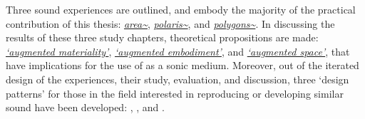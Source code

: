 \begin{SingleSpace}
    Three sound  experiences are outlined, and embody the majority of the practical contribution of this thesis: \textit{\hyperref[sec: area]{area\textasciitilde{}}}, \textit{\hyperref[sec: polaris]{polaris\textasciitilde{}}}, and \textit{\hyperref[sec: polygons]{polygons\textasciitilde{}}}. In discussing the results of these three study chapters, theoretical propositions are made: \textit{\hyperref[sec: discussion-medium-material]{`augmented materiality'}}, \textit{\hyperref[sec: discussion-medium-embodiment]{`augmented embodiment'}}, and \textit{\hyperref[sec: discussion-medium-space]{`augmented space'}}, that have implications for the use of  as a sonic medium. Moreover, out of the iterated design of the  experiences, their study, evaluation, and discussion, three `design patterns' for those in the field interested in reproducing or developing similar sound  have been developed: \textit{\hyperref[sec: discussion-patterns-experience]{}}, \textit{\hyperref[sec: discussion-patterns-instrument]{}}, and \textit{\hyperref[sec: discussion-patterns-environment]{}}.   
\end{SingleSpace}
\glsresetall